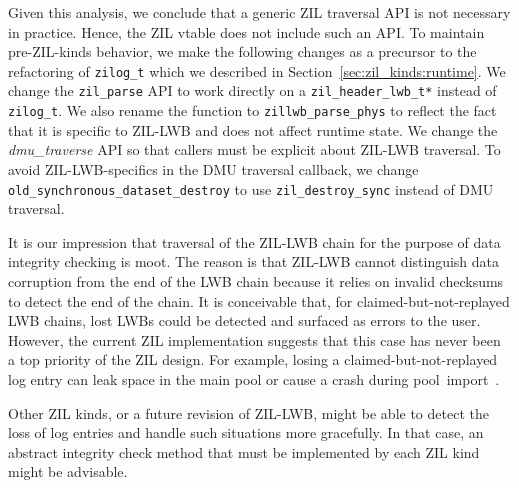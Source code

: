 \documentclass[12pt,a4paper,twoside]{book}
\begin{document}
Given this analysis, we conclude that a generic ZIL traversal API is not necessary in practice.
Hence, the ZIL vtable does not include such an API.
To maintain pre-ZIL-kinds behavior, we make the following changes as a precursor to the refactoring of \lstinline{zilog_t} which we described in Section~\ref{sec:zil_kinds:runtime}.
We change the \lstinline{zil_parse} API to work directly on a \lstinline{zil_header_lwb_t*} instead of \lstinline{zilog_t}.
We also rename the function to \lstinline{zillwb_parse_phys} to reflect the fact that it is specific to ZIL-LWB and does not affect runtime state.
We change the \textit{dmu\_traverse} API so that callers must be explicit about ZIL-LWB traversal.
To avoid ZIL-LWB-specifics in the DMU traversal callback, we change \lstinline{old_synchronous_dataset_destroy} to use \lstinline{zil_destroy_sync} instead of DMU traversal.

It is our impression that traversal of the ZIL-LWB chain for the purpose of data integrity checking is moot.
The reason is that ZIL-LWB cannot distinguish data corruption from the end of the LWB chain because it relies on invalid checksums to detect the end of the chain.
It is conceivable that, for claimed-but-not-replayed LWB chains, lost LWBs could be detected and surfaced as errors to the user.
However, the current ZIL implementation suggests that this case has never been a top priority of the ZIL design.
For example, losing a claimed-but-not-replayed log entry can leak space in the main pool or cause a crash during \mbox{pool import \cite{OpenZFSGithubIssueHandlingOfLostClaimedNotReplayedLogRecords,OpenZFSGithubIssueFailingDebugAssertionWhenLosingClaimedNotReplayedLWBs}}.

Other ZIL kinds, or a future revision of ZIL-LWB, might be able to detect the loss of log entries and handle such situations more gracefully.
In that case, an abstract integrity check method that must be implemented by each ZIL kind might be advisable.
\end{document}
